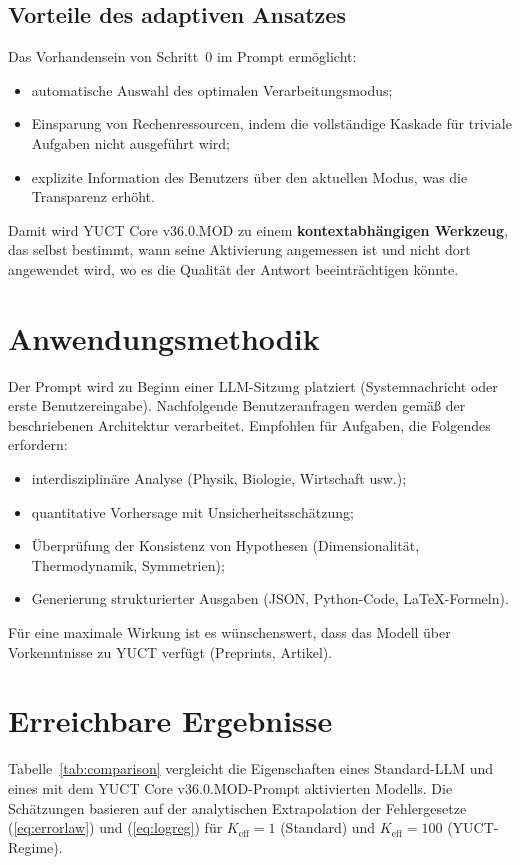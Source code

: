 \documentclass[11pt,a4paper]{article}
\begin{document}
	\subsection{Vorteile des adaptiven Ansatzes}
	Das Vorhandensein von Schritt~0 im Prompt ermöglicht:
	\begin{itemize}
		\item automatische Auswahl des optimalen Verarbeitungsmodus;
		\item Einsparung von Rechenressourcen, indem die vollständige Kaskade für triviale Aufgaben nicht ausgeführt wird;
		\item explizite Information des Benutzers über den aktuellen Modus, was die Transparenz erhöht.
	\end{itemize}
	
	Damit wird YUCT Core v36.0.MOD zu einem \textbf{kontextabhängigen Werkzeug}, das selbst bestimmt, wann seine Aktivierung angemessen ist und nicht dort angewendet wird, wo es die Qualität der Antwort beeinträchtigen könnte.
	
	\section{Anwendungsmethodik}
	Der Prompt wird zu Beginn einer LLM-Sitzung platziert (Systemnachricht oder erste Benutzereingabe). Nachfolgende Benutzeranfragen werden gemäß der beschriebenen Architektur verarbeitet. Empfohlen für Aufgaben, die Folgendes erfordern:
	\begin{itemize}
		\item interdisziplinäre Analyse (Physik, Biologie, Wirtschaft usw.);
		\item quantitative Vorhersage mit Unsicherheitsschätzung;
		\item Überprüfung der Konsistenz von Hypothesen (Dimensionalität, Thermodynamik, Symmetrien);
		\item Generierung strukturierter Ausgaben (JSON, Python-Code, LaTeX-Formeln).
	\end{itemize}
	Für eine maximale Wirkung ist es wünschenswert, dass das Modell über Vorkenntnisse zu YUCT verfügt (Preprints, Artikel).
	
	\section{Erreichbare Ergebnisse}
	Tabelle~\ref{tab:comparison} vergleicht die Eigenschaften eines Standard-LLM und eines mit dem YUCT Core v36.0.MOD-Prompt aktivierten Modells. Die Schätzungen basieren auf der analytischen Extrapolation der Fehlergesetze (\ref{eq:errorlaw}) und (\ref{eq:logreg}) für \(K_{\mathrm{eff}}=1\) (Standard) und \(K_{\mathrm{eff}}=100\) (YUCT-Regime).
	
\end{document}
